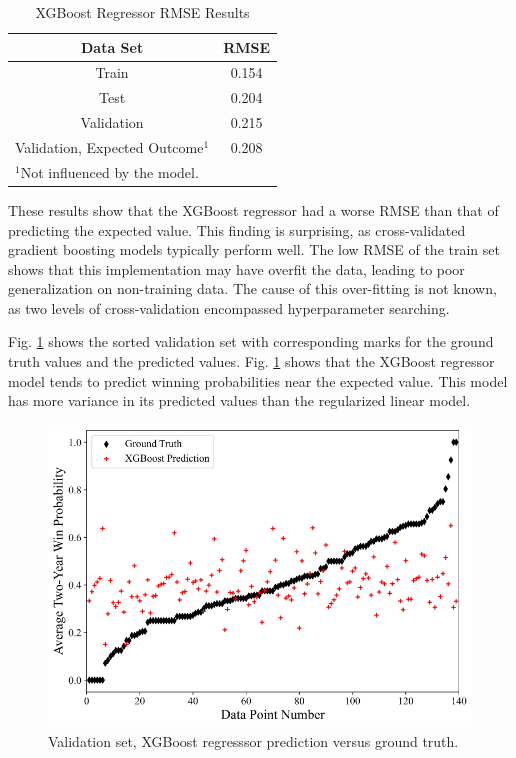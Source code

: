 \documentclass[conference]{IEEEtran}
\begin{document}
\begin{table}[htbp]
\caption{XGBoost Regressor RMSE Results}
\begin{center}
\begin{tabular}{|c||c|}
\hline
\textbf{Data Set} & \textbf{RMSE} \\
\hline
\hline
Train & 0.154 \\
\hline
Test & 0.204 \\
\hline
Validation & 0.215 \\
\hline
Validation, Expected Outcome$^{\mathrm{1}}$ & 0.208 \\
\hline
\multicolumn{2}{l}{$^{\mathrm{1}}$Not influenced by the model.}
\end{tabular}
\label{tab5}
\end{center}
\end{table}

These results show that the XGBoost regressor had a worse RMSE than that of predicting the expected value. This finding is surprising, as cross-validated gradient boosting models typically perform well. The low RMSE of the train set shows that this implementation may have overfit the data, leading to poor generalization on non-training data. The cause of this over-fitting is not known, as two levels of cross-validation encompassed hyperparameter searching.

Fig. \ref{fig6} shows the sorted validation set with corresponding marks for the ground truth values and the predicted values.  Fig. \ref{fig6} shows that the XGBoost regressor model tends to predict winning probabilities near the expected value. This model has more variance in its predicted values than the regularized linear model. 

\begin{figure}[htbp]
\centerline{\includegraphics[width=1\linewidth]{test2.png}}
\caption{Validation set, XGBoost regresssor prediction versus ground truth.}
\label{fig6}
\end{figure}
\end{document}
